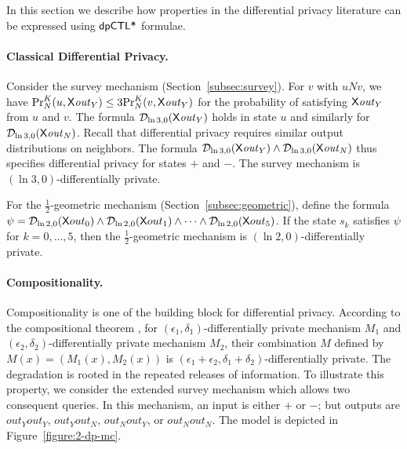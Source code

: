 In this section we describe how properties in the differential privacy literature can be expressed using $\dpCTLstar$ formulae.

\paragraph{Classical Differential Privacy.}
Consider the survey mechanism (Section~\ref{subsec:survey}). For  $v$
with $u N v$, we have $\myPr{u}{K}{N}{\X \mathit{out}_Y}\le
3\myPr{v}{K}{N}{\X \mathit{out}_Y}$ for the probability of satisfying
$\X \mathit{out}_Y$ from $u$ and $v$.
The formula $\dpriv{\ln 3}{0} (\X \mathit{out}_Y)$ holds in state $u$
and similarly for $\dpriv{\ln 3}{0} (\X \mathit{out}_N)$. 
Recall that differential privacy requires similar output distributions
on neighbors. The formula $\dpriv{\ln 3}{0} (\X
\mathit{out}_Y)\wedge \dpriv{\ln 3}{0} (\X \mathit{out}_N)$ thus
specifies differential privacy for states $+$ and $-$. 
The survey mechanism is $(\ln 3, 0)$-differentially private.



For the $\frac{1}{2}$-geometric mechanism (Section~\ref{subsec:geometric}),
define the formula
$\psi = \dpriv{\ln 2}{0} (\X out_0) \wedge \dpriv{\ln 2}{0} (\X out_1) \wedge
\cdots \wedge \dpriv{\ln 2}{0} (\X out_5)$. If the state $s_k$ satisfies
$\psi$ for $k = 0, \ldots, 5$, then the $\frac{1}{2}$-geometric mechanism is
$(\ln 2, 0)$-differentially private.


\paragraph{Compositionality.}
Compositionality is one of the building block for differential privacy. According to the compositional theorem \cite[Theorem 3.16]{DR:14:AFDP}, for $(\epsilon_1,\delta_1)$-differentially private mechanism $M_1$ and
$(\epsilon_2,\delta_2)$-differentially private mechanism $M_2$, their combination $M$ defined by $M(x)=(M_1(x), M_2(x))$ is $(\epsilon_1 + \epsilon_2,\delta_1+\delta_2)$-differentially private. The degradation is rooted in the repeated releases of information. To illustrate this property, we consider the extended survey mechanism which allows two consequent queries.
In this mechanism, an input is either $+$ or $-$; but 
outputs are $\mathit{out}_Y\mathit{out}_Y$,
$\mathit{out}_Y\mathit{out}_N$, $\mathit{out}_N\mathit{out}_Y$, or
$\mathit{out}_N\mathit{out}_N$. 
The model is depicted in Figure~\ref{figure:2-dp-mc}.

